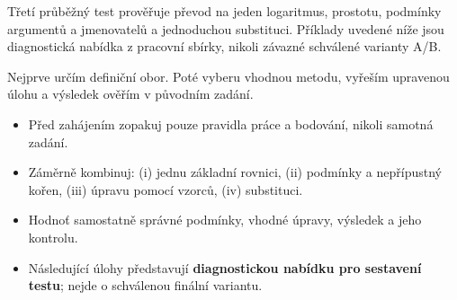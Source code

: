 \documentclass[11pt,a4paper]{article}
\begin{document}
Třetí průběžný test prověřuje převod na jeden logaritmus, prostotu, podmínky argumentů a jmenovatelů a jednoduchou substituci. Příklady uvedené níže jsou diagnostická nabídka z pracovní sbírky, nikoli závazné schválené varianty A/B.

Nejprve určím definiční obor. Poté vyberu vhodnou metodu, vyřeším upravenou úlohu a výsledek ověřím v původním zadání.

\begin{itemize}
\item Před zahájením zopakuj pouze pravidla práce a bodování, nikoli samotná zadání.
\item Záměrně kombinuj: (i) jednu základní rovnici, (ii) podmínky a nepřípustný kořen, (iii) úpravu pomocí vzorců, (iv) substituci.
\item Hodnoť samostatně správné podmínky, vhodné úpravy, výsledek a jeho kontrolu.
\item Následující úlohy představují \textbf{diagnostickou nabídku pro sestavení testu}; nejde o schválenou finální variantu.
\end{itemize}
\end{document}
